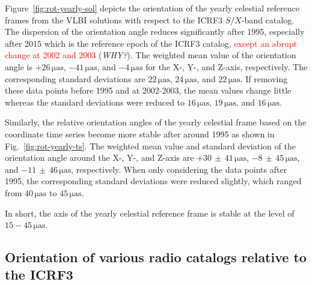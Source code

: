 \documentclass{aa}
\begin{document}
    Figure~\ref{fig:rot-yearly-sol} depicts the orientation of the yearly celestial reference frames from the VLBI solutions with respect to the ICRF3 $S/X$-band catalog.
    The dispersion of the orientation angle reduces significantly after 1995, especially after 2015 which is the reference epoch of the ICRF3 catalog, \textcolor{red}{except an abrupt change at 2002 and 2003} (\textit{WHY?}).
    The weighted mean value of the orientation angle is $\mathrm{+26\,\mu as}$, $\mathrm{-41\,\mu as}$, and $\mathrm{-4\,\mu as}$ for the X-, Y-, and Z-axis, respectively.
    The corresponding standard deviations are $\mathrm{22\,\mu as}$, $\mathrm{24\,\mu as}$, and $\mathrm{22\,\mu as}$.
    If removing these data points before 1995 and at 2002-2003, the mean values change little whereas the standard deviations were reduced to $\mathrm{16\,\mu as}$, $\mathrm{19\,\mu as}$, and $\mathrm{16\,\mu as}$.
    
    Similarly, the relative orientation angles of the yearly celestial frame based on the coordinate time series become more stable after around 1995 as shown in Fig.~\ref{fig:rot-yearly-ts}.
    The weighted mean value and standard deviation of the orientation angle around the X-, Y-, and Z-axis are $\mathrm{+30\,\pm\,41\,\mu as}$, $\mathrm{-8\,\pm\,45\,\mu as}$, and $\mathrm{-11\,\pm\,46\,\mu as}$, respectively.
    When only considering the data points after 1995, the corresponding standard deviations were reduced slightly, which ranged from $\mathrm{40\,\mu as}$ to $\mathrm{45\,\mu as}$.
    
    In short, the axis of the yearly celestial reference frame is stable at the level of $\mathrm{15-45\,\mu as}$.
    
    

\subsection{Orientation of various radio catalogs relative to the ICRF3}  \label{subsec:orient-from-ivs-sol}    
    
\end{document}
